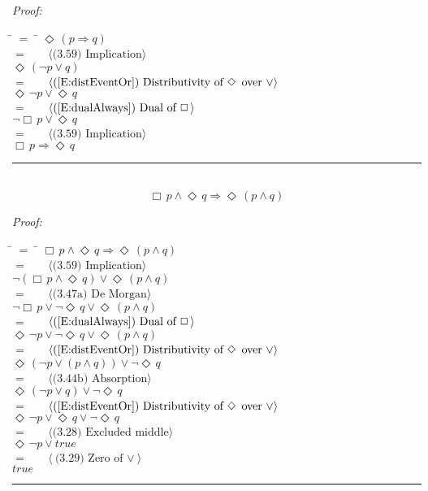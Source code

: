 \documentclass[fleqn, leqno]{article}
\newcommand{\lgap}{2pt} %
\newcommand{\mymathindent}{24pt} %
\newcommand{\Event}{\Diamond\,}
\newcommand{\Always}{\Box\,}
\newcommand{\myqed}{\hfill\rule[-.23ex]{1.2ex}{2.0ex}}
\newcommand{\Gll} {\langle} %
\newcommand{\Ggg} {\rangle} %
\newcommand{\Hint}[1] {\ \ \ $\Gll \mbox{#1} \Ggg$ } %
\begin{document}
\emph{Proof:}
\begin{tabbing}
\hspace{\mymathindent} \= $= \;$ \= \kill
\> \> $\Event(p \Rightarrow q)$\\[\lgap]
\> $=$ \> \Hint{(3.59) Implication}\\[\lgap]
\> \> $\Event(\lnot p \lor q)$\\[\lgap]
\> $=$ \> \Hint{(\ref{E:distEventOr}) Distributivity of $\Event$ over $\lor$}\\[\lgap]
\> \> $\Event\lnot p \lor \Event q$\\[\lgap]
\> $=$ \> \Hint{(\ref{E:dualAlways}) Dual of $\Always$}\\[\lgap]
\> \> $\lnot\Always p \lor \Event q$\\[\lgap]
\> $=$ \> \Hint{(3.59) Implication}\\[\lgap]
\> \> $\Always p \Rightarrow \Event q$\\[\lgap]
\end{tabbing}
\myqed\\[\lgap]


\begin{equation}\label{E:alwaysAndEvent}
\Always p \land \Event q \Rightarrow \Event (p \land q)
\end{equation}

\emph{Proof:}
\begin{tabbing}
\hspace{\mymathindent} \= $= \;$ \= \kill
\> \> $\Always p \land \Event q \Rightarrow \Event (p \land q)$\\[\lgap]
\> $=$ \> \Hint{(3.59) Implication}\\[\lgap]
\> \> $\lnot(\Always p \land \Event q) \lor \Event(p \land q)$\\[\lgap]
\> $=$ \> \Hint{(3.47a) De Morgan}\\[\lgap]
\> \> $\lnot\Always p \lor \lnot\Event q \lor \Event(p \land q)$\\[\lgap]
\> $=$ \> \Hint{(\ref{E:dualAlways}) Dual of $\Always$}\\[\lgap]
\> \> $\Event\lnot p \lor \lnot\Event q \lor \Event(p \land q)$\\[\lgap]
\> $=$ \> \Hint{(\ref{E:distEventOr}) Distributivity of $\Event$ over $\lor$}\\[\lgap]
\> \> $\Event(\lnot p \lor (p \land q)) \lor \lnot\Event q$\\[\lgap]
\> $=$ \> \Hint{(3.44b) Absorption}\\[\lgap]
\> \> $\Event(\lnot p \lor q) \lor \lnot\Event q$\\[\lgap]
\> $=$ \> \Hint{(\ref{E:distEventOr}) Distributivity of $\Event$ over $\lor$}\\[\lgap]
\> \> $\Event\lnot p \lor \Event q \lor \lnot\Event q$\\[\lgap]
\> $=$ \> \Hint{(3.28) Excluded middle}\\[\lgap]
\> \> $\Event\lnot p \lor true$\\[\lgap]
\> $=$ \> \Hint{(3.29) Zero of $\lor$}\\[\lgap]
\> \> $true$\\[\lgap]
\end{tabbing}
\myqed\\[\lgap]
\end{document}
